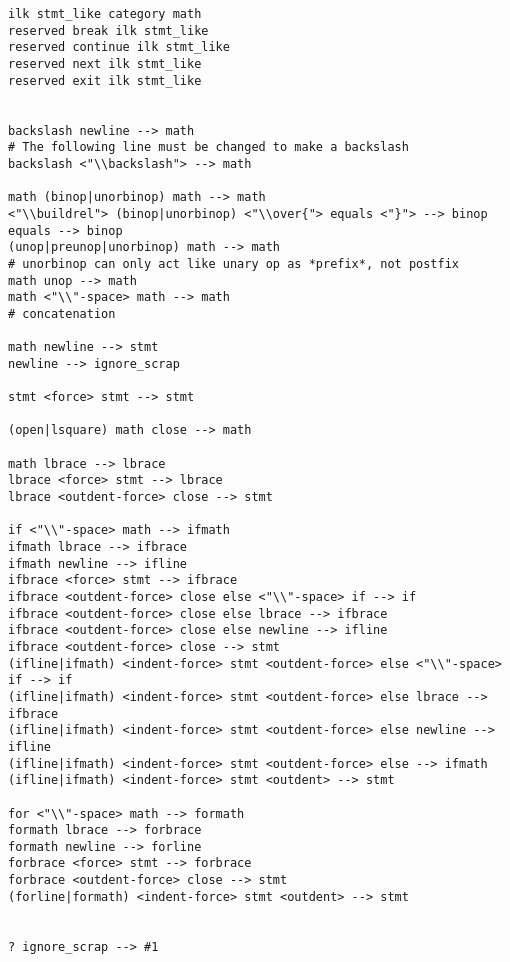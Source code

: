 \begin{verbatim}
ilk stmt_like category math
reserved break ilk stmt_like
reserved continue ilk stmt_like
reserved next ilk stmt_like
reserved exit ilk stmt_like


backslash newline --> math
# The following line must be changed to make a backslash
backslash <"\\backslash"> --> math

math (binop|unorbinop) math --> math
<"\\buildrel"> (binop|unorbinop) <"\\over{"> equals <"}"> --> binop
equals --> binop
(unop|preunop|unorbinop) math --> math
# unorbinop can only act like unary op as *prefix*, not postfix
math unop --> math
math <"\\"-space> math --> math
# concatenation

math newline --> stmt
newline --> ignore_scrap

stmt <force> stmt --> stmt

(open|lsquare) math close --> math

math lbrace --> lbrace
lbrace <force> stmt --> lbrace
lbrace <outdent-force> close --> stmt

if <"\\"-space> math --> ifmath
ifmath lbrace --> ifbrace
ifmath newline --> ifline
ifbrace <force> stmt --> ifbrace
ifbrace <outdent-force> close else <"\\"-space> if --> if
ifbrace <outdent-force> close else lbrace --> ifbrace
ifbrace <outdent-force> close else newline --> ifline
ifbrace <outdent-force> close --> stmt
(ifline|ifmath) <indent-force> stmt <outdent-force> else <"\\"-space> if --> if
(ifline|ifmath) <indent-force> stmt <outdent-force> else lbrace --> ifbrace
(ifline|ifmath) <indent-force> stmt <outdent-force> else newline --> ifline
(ifline|ifmath) <indent-force> stmt <outdent-force> else --> ifmath
(ifline|ifmath) <indent-force> stmt <outdent> --> stmt

for <"\\"-space> math --> formath
formath lbrace --> forbrace
formath newline --> forline
forbrace <force> stmt --> forbrace
forbrace <outdent-force> close --> stmt
(forline|formath) <indent-force> stmt <outdent> --> stmt


? ignore_scrap --> #1
\end{verbatim}
\endgroup



